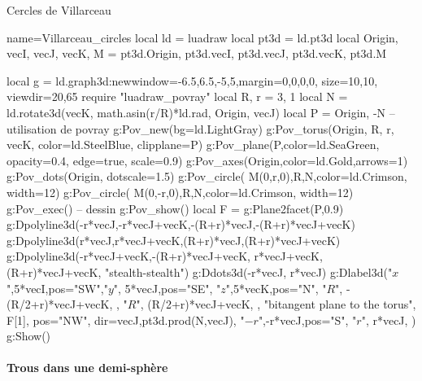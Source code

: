 \begin{demo}{Cercles de Villarceau}
\begin{luadraw}{name=Villarceau_circles}
local ld = luadraw
local pt3d = ld.pt3d
local Origin, vecI, vecJ, vecK, M = pt3d.Origin, pt3d.vecI, pt3d.vecJ, pt3d.vecK, pt3d.M

local g = ld.graph3d:new{window={-6.5,6.5,-5,5},margin={0,0,0,0}, size={10,10}, viewdir={20,65}}
require "luadraw_povray"
local R, r = 3, 1
local N = ld.rotate3d(vecK, math.asin(r/R)*ld.rad, {Origin, vecJ})
local P = {Origin, -N}
-- utilisation de povray
g:Pov_new({bg=ld.LightGray})
g:Pov_torus(Origin, R, r, vecK, {color=ld.SteelBlue, clipplane=P})
g:Pov_plane(P,{color=ld.SeaGreen, opacity=0.4, edge=true, scale=0.9})
g:Pov_axes(Origin,{color=ld.Gold,arrows=1})
g:Pov_dots(Origin, {dotscale=1.5})
g:Pov_circle( M(0,r,0),R,N,{color=ld.Crimson, width=12})
g:Pov_circle( M(0,-r,0),R,N,{color=ld.Crimson, width=12})
g:Pov_exec()
-- dessin
g:Pov_show()
local F = g:Plane2facet(P,0.9)
g:Dpolyline3d({{-r*vecJ,-r*vecJ+vecK},{-(R+r)*vecJ,-(R+r)*vecJ+vecK}})
g:Dpolyline3d({{r*vecJ,r*vecJ+vecK},{(R+r)*vecJ,(R+r)*vecJ+vecK}})
g:Dpolyline3d({{-r*vecJ+vecK,-(R+r)*vecJ+vecK}, {r*vecJ+vecK,(R+r)*vecJ+vecK}}, "stealth-stealth")
g:Ddots3d({-r*vecJ, r*vecJ})
g:Dlabel3d("$x$",5*vecI,{pos="SW"},"$y$", 5*vecJ,{pos="SE"}, "$z$",5*vecK,{pos="N"},
  "$R$", -(R/2+r)*vecJ+vecK, {}, "$R$", (R/2+r)*vecJ+vecK, {},
  "bitangent plane to the torus", F[1], {pos="NW", dir={vecJ,pt3d.prod(N,vecJ)}},
  "$-r$",-r*vecJ,{pos="S"}, "$r$", r*vecJ,{} )
g:Show()
\end{luadraw}
\end{demo}

\paragraph{Trous dans une demi-sphère}

